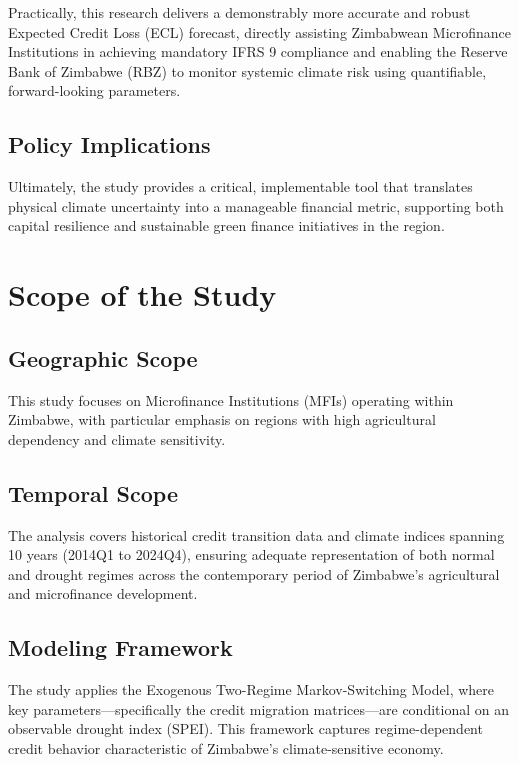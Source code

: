 \documentclass[12pt,a4paper]{article}
\begin{document}
Practically, this research delivers a demonstrably more accurate and robust Expected Credit Loss (ECL) forecast, directly assisting Zimbabwean Microfinance Institutions in achieving mandatory IFRS 9 compliance and enabling the Reserve Bank of Zimbabwe (RBZ) to monitor systemic climate risk using quantifiable, forward-looking parameters.

\subsection{Policy Implications}

Ultimately, the study provides a critical, implementable tool that translates physical climate uncertainty into a manageable financial metric, supporting both capital resilience and sustainable green finance initiatives in the region.

\section{Scope of the Study}

\subsection{Geographic Scope}

This study focuses on Microfinance Institutions (MFIs) operating within Zimbabwe, with particular emphasis on regions with high agricultural dependency and climate sensitivity.

\subsection{Temporal Scope}

The analysis covers historical credit transition data and climate indices spanning 10 years (2014Q1 to 2024Q4), ensuring adequate representation of both normal and drought regimes across the contemporary period of Zimbabwe's agricultural and microfinance development.

\subsection{Modeling Framework}

The study applies the Exogenous Two-Regime Markov-Switching Model, where key parameters---specifically the credit migration matrices---are conditional on an observable drought index (SPEI). This framework captures regime-dependent credit behavior characteristic of Zimbabwe's climate-sensitive economy.
\end{document}
